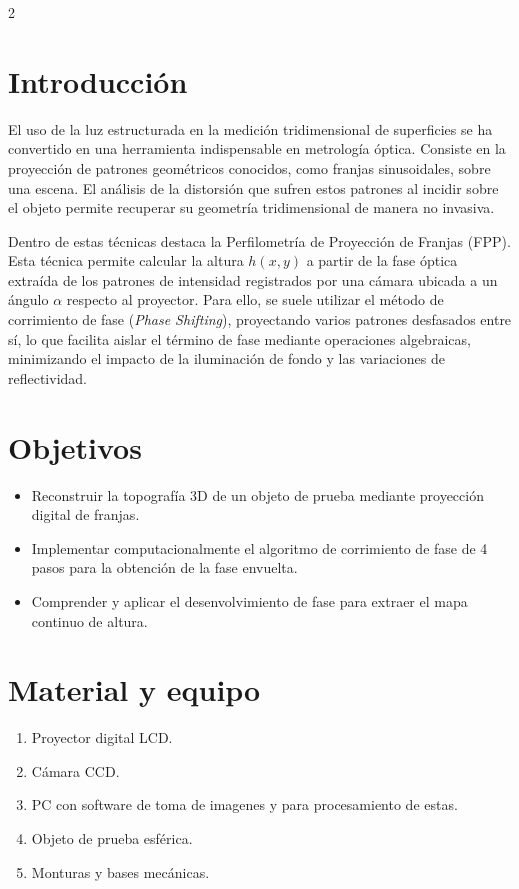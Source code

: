 \documentclass[letterpaper]{article}
\begin{document}
	\begin{multicols}{2}
		
		\section*{Introducción}
		
		El uso de la luz estructurada en la medición tridimensional de superficies se ha convertido en una herramienta indispensable en metrología óptica. Consiste en la proyección de patrones geométricos conocidos, como franjas sinusoidales, sobre una escena. El análisis de la distorsión que sufren estos patrones al incidir sobre el objeto permite recuperar su geometría tridimensional de manera no invasiva.
		
		Dentro de estas técnicas destaca la Perfilometría de Proyección de Franjas (FPP). Esta técnica permite calcular la altura $h(x,y)$ a partir de la fase óptica extraída de los patrones de intensidad registrados por una cámara ubicada a un ángulo $\alpha$ respecto al proyector. Para ello, se suele utilizar el método de corrimiento de fase (\textit{Phase Shifting}), proyectando varios patrones desfasados entre sí, lo que facilita aislar el término de fase mediante operaciones algebraicas, minimizando el impacto de la iluminación de fondo y las variaciones de reflectividad.
		
		\section*{Objetivos}
		
		\begin{itemize}
			\item Reconstruir la topografía 3D de un objeto de prueba mediante proyección digital de franjas.
			\item Implementar computacionalmente el algoritmo de corrimiento de fase de 4 pasos para la obtención de la fase envuelta.
			\item Comprender y aplicar el desenvolvimiento de fase para extraer el mapa continuo de altura.
		\end{itemize}
		
		\section*{Material y equipo}
		
		\begin{enumerate}
			\item Proyector digital LCD.
			\item Cámara CCD.
			\item PC con software de toma de imagenes y para procesamiento de estas.
			\item Objeto de prueba esférica.
			\item Monturas y bases mecánicas.
		\end{enumerate}
		

\end{multicols}
\end{document}
